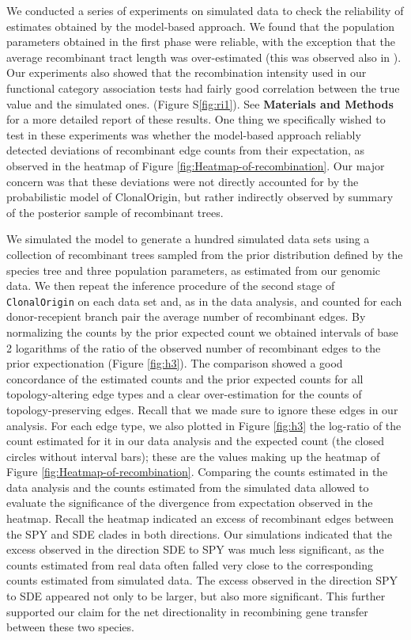 \documentclass[10pt]{article}
\let\citep\cite
\begin{document}
We conducted a series of experiments on simulated data to check the reliability
of estimates obtained by the model-based approach. We found that the population
parameters obtained in the first phase were reliable, with the exception that
the average recombinant tract length was over-estimated (this was observed also
in \citep{Didelot2010}). Our experiments also showed that the recombination
intensity used in our functional category association tests had fairly good
correlation between the true value and the simulated ones.  (Figure
S\ref{fig:ri1}). See \textbf{Materials and Methods} for a more detailed report
of these results. One thing we specifically wished to test in these experiments
was whether the model-based approach reliably detected deviations of recombinant
edge counts from their expectation, as observed in the heatmap of Figure
\ref{fig:Heatmap-of-recombination}. Our major concern was that these deviations
were not directly accounted for by the probabilistic model of ClonalOrigin, but
rather indirectly observed by summary of the posterior sample of recombinant
trees. 

We simulated the model to generate a hundred simulated data sets using a
collection of recombinant trees sampled from the prior distribution defined by
the species tree and three population parameters, as estimated from our genomic
data.  We then repeat the inference procedure of the second stage of
\texttt{ClonalOrigin} on each data set and, as in the data analysis, and counted
for each donor-recepient branch pair the average number of recombinant edges.
By normalizing the counts by the prior expected count we obtained intervals of
base 2 logarithms of the ratio of the observed number of recombinant edges to
the prior expectionation (Figure \ref{fig:h3}). The comparison showed a good
concordance of the estimated counts and the prior expected counts for all
topology-altering edge types and a clear over-estimation for the counts of
topology-preserving edges. Recall that we made sure to ignore these edges in our
analysis. For each edge type, we also plotted in Figure \ref{fig:h3} the
log-ratio of the count estimated for it in our data analysis and the expected
count (the closed circles without interval bars); these are the values making up
the heatmap of Figure \ref{fig:Heatmap-of-recombination}. Comparing the counts
estimated in the data analysis and the counts estimated from the simulated data
allowed to evaluate the significance of the divergence from expectation observed
in the heatmap.  Recall the heatmap indicated an excess of recombinant edges
between the SPY and SDE clades in both directions. Our simulations indicated
that the excess observed in the direction SDE to SPY was much less significant,
as the counts estimated from real data often falled very close to the
corresponding counts estimated from simulated data. The excess observed in the
direction SPY to SDE appeared not only to be larger, but also more significant.
This further supported our claim for the net directionality in recombining gene
transfer between these two species.
\end{document}
